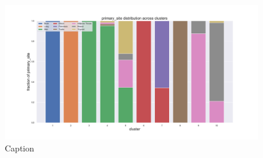 \begin{figure}[htb!]
    \centering
    \includegraphics[width=0.9\linewidth]{pictures/topic/gtex/oversigma_10tissue/fraction_clustercomposition_l3_primary_site.pdf}
    \caption{Caption}
    \label{fig:topic/gtex/oversigma_10tissue/fraction_clustercomposition_l2_primary_site}
\end{figure}

